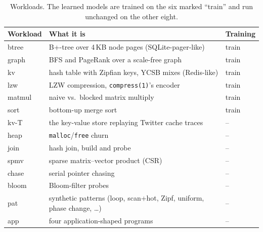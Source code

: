 \begin{table}[t]
\caption{Workloads. The learned models are trained on the six marked ``train'' and run
unchanged on the other eight.}
\label{tab:workloads}
\vskip 0.1in
\begin{center}
\begin{footnotesize}
\setlength{\tabcolsep}{3pt}
\begin{tabular}{@{}l>{\raggedright\arraybackslash}p{1.95in}l@{}}
\toprule
Workload & What it is & Training \\
\midrule
btree  & B+-tree over 4\,KB node pages (SQLite-pager-like)        & train \\
graph  & BFS and PageRank over a scale-free graph                 & train \\
kv     & hash table with Zipfian keys, YCSB mixes (Redis-like)     & train \\
lzw    & LZW compression, \texttt{compress(1)}'s encoder           & train \\
matmul & naive vs.\ blocked matrix multiply                       & train \\
sort   & bottom-up merge sort                                     & train \\
\midrule
kv-T   & the key-value store replaying Twitter cache traces       & -- \\
heap   & \texttt{malloc}/\texttt{free} churn                      & -- \\
join   & hash join, build and probe                               & -- \\
spmv   & sparse matrix--vector product (CSR)                      & -- \\
chase  & serial pointer chasing                                   & -- \\
bloom  & Bloom-filter probes                                      & -- \\
pat    & 11 synthetic patterns (loop, scan+hot, Zipf, uniform, phase change, \ldots) & -- \\
app    & four application-shaped programs                         & -- \\
\bottomrule
\end{tabular}
\end{footnotesize}
\end{center}
\vskip -0.1in
\end{table}


